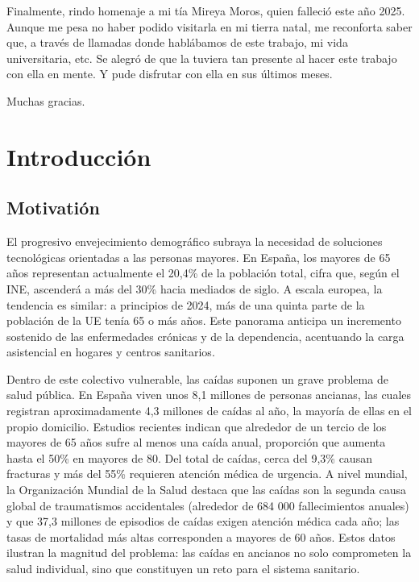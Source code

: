\documentclass[12pt, a4paper]{article}
\begin{document}
Finalmente, rindo homenaje a mi t\'ia Mireya Moros, quien falleci\'o este a\~no 2025. Aunque me pesa no haber podido visitarla en mi tierra natal, me reconforta saber que, a trav\'es de llamadas donde hablábamos de este trabajo, mi vida universitaria, etc. Se alegró de que la tuviera tan presente al hacer este trabajo con ella en mente. Y pude disfrutar con ella en sus últimos meses.

\vspace{1em}

Muchas gracias.

\tableofcontents

\section{Introducción}

	\subsection{Motivatión}
    
    El progresivo envejecimiento demográfico subraya la necesidad de soluciones tecnológicas orientadas a las personas mayores. En España, los mayores de 65 años representan actualmente el 20,4\% de la población total, cifra que, según el INE\cite{INE2024}, ascenderá a más del 30\% hacia mediados de siglo. A escala europea, la tendencia es similar: a principios de 2024, más de una quinta parte de la población de la UE tenía 65 o más años\cite{Euro2025}. Este panorama anticipa un incremento sostenido de las enfermedades crónicas y de la dependencia, acentuando la carga asistencial en hogares y centros sanitarios.
    
    Dentro de este colectivo vulnerable, las caídas suponen un grave problema de salud pública. En España viven unos 8,1 millones de personas ancianas, las cuales registran aproximadamente 4,3 millones de caídas al año, la mayoría de ellas en el propio domicilio\cite{Rodriguez2015}. Estudios recientes indican que alrededor de un tercio de los mayores de 65 años sufre al menos una caída anual, proporción que aumenta hasta el 50\% en mayores de 80. Del total de caídas, cerca del 9,3\% causan fracturas y más del 55\% requieren atención médica de urgencia. A nivel mundial, la Organización Mundial de la Salud destaca que las caídas son la segunda causa global de traumatismos accidentales (alrededor de 684 000 fallecimientos anuales) y que 37,3 millones de episodios de caídas exigen atención médica cada año; las tasas de mortalidad más altas corresponden a mayores de 60 años\cite{OMS2021}. Estos datos ilustran la magnitud del problema: las caídas en ancianos no solo comprometen la salud individual, sino que constituyen un reto para el sistema sanitario.
    
\end{document}

